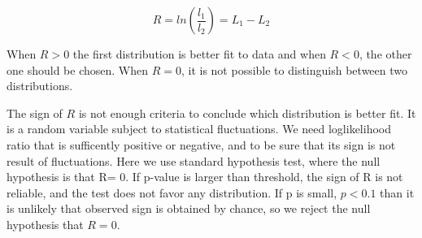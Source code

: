 \begin{equation}
R = ln(\frac{l_1}{l_2}) = L_1 - L_2
\end{equation}

When $R>0$ the first distribution is better fit to data and when $R<0$, the other one should be chosen. When $R=0$, it is not possible to distinguish between two distributions. 

The sign of $R$ is not enough criteria to conclude which distribution is better fit. It is a random variable subject to statistical fluctuations. We need loglikelihood ratio that is sufficently positive or negative, and to be sure that its sign is not result of fluctuations. Here we use standard hypothesis test, where the null hypothesis is that R= 0. If p-value is larger than threshold, the sign of R is not reliable, and the test does not favor any distribution. If p is small, $p<0.1$ than it is unlikely that observed sign is obtained by chance, so we reject the null hypothesis that $R=0$. 


















